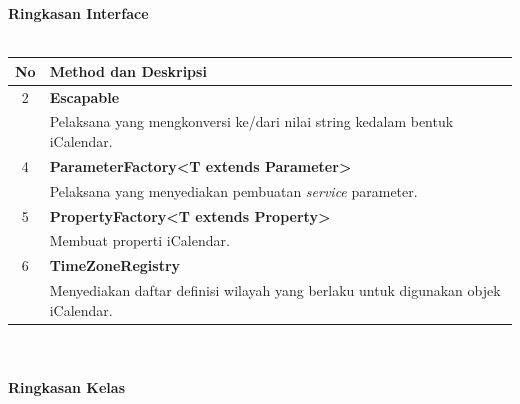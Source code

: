 \noindent \textbf{Ringkasan Interface}\cite{ical}\\ \\
	\begin{tabular}{|c|p{12cm}|}
		\hline
		\textbf{No} & \textbf{Method dan Deskripsi} \\ \hline \hline
		2 & \textbf{Escapable}\\
			&	Pelaksana yang mengkonversi ke/dari nilai string kedalam bentuk iCalendar.\\ \hline
		4 & \textbf{ParameterFactory<T extends Parameter>}\\
			&	Pelaksana yang menyediakan pembuatan \textit{service} parameter.\\ \hline
		5 & \textbf{PropertyFactory<T extends Property>}\\
			&	Membuat properti iCalendar.\\ \hline
		6 & \textbf{TimeZoneRegistry}\\
			&	Menyediakan daftar definisi wilayah yang berlaku untuk digunakan objek iCalendar.\\ \hline
	\end{tabular}
	\\ \\
	\noindent \textbf{Ringkasan Kelas}\cite{ical}\\ \\
